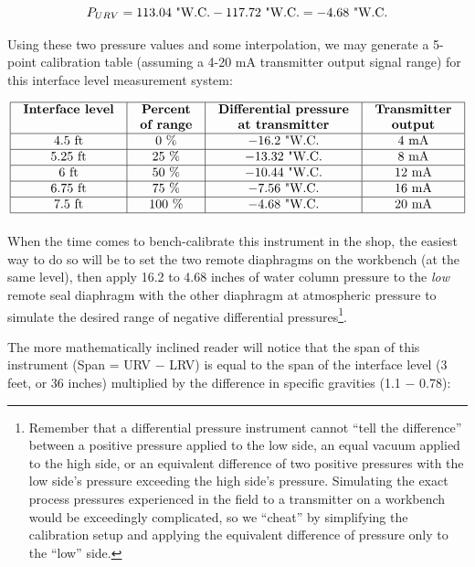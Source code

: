 $$P_{URV} = 113.04 \hbox{ "W.C.} - 117.72 \hbox{ "W.C.} = -4.68 \hbox{ "W.C.}$$

\filbreak

Using these two pressure values and some interpolation, we may generate a 5-point calibration table (assuming a 4-20 mA transmitter output signal range) for this interface level measurement system:


$$\vbox{\offinterlineskip
\halign{\strut
\vrule \quad\hfil # \ \hfil & 
\vrule \quad\hfil # \ \hfil & 
\vrule \quad\hfil # \ \hfil & 
\vrule \quad\hfil # \ \hfil \vrule \cr
\noalign{\hrule}
%
\textbf{Interface level} & \textbf{Percent} & \textbf{Differential pressure} & \textbf{Transmitter} \cr
 & \textbf{of range} & \textbf{at transmitter} & \textbf{output} \cr
%
\noalign{\hrule}
%
4.5 ft & 0 \% & $-16.2$ "W.C. & 4 mA \cr
%
\noalign{\hrule}
%
5.25 ft & 25 \% & $-13.32$ "W.C. & 8 mA \cr
%
\noalign{\hrule}
%
6 ft & 50 \% & $-10.44$ "W.C. & 12 mA \cr
%
\noalign{\hrule}
%
6.75 ft & 75 \% & $-7.56$ "W.C. & 16 mA \cr
%
\noalign{\hrule}
%
7.5 ft & 100 \% & $-4.68$ "W.C. & 20 mA \cr
%
\noalign{\hrule}
} %
}$$ %

When the time comes to bench-calibrate this instrument in the shop, the easiest way to do so will be to set the two remote diaphragms on the workbench (at the same level), then apply 16.2 to 4.68 inches of water column pressure to the \textit{low} remote seal diaphragm with the other diaphragm at atmospheric pressure to simulate the desired range of negative differential pressures\footnote{Remember that a differential pressure instrument cannot ``tell the difference'' between a positive pressure applied to the low side, an equal vacuum applied to the high side, or an equivalent difference of two positive pressures with the low side's pressure exceeding the high side's pressure.  Simulating the exact process pressures experienced in the field to a transmitter on a workbench would be exceedingly complicated, so we ``cheat'' by simplifying the calibration setup and applying the equivalent difference of pressure only to the ``low'' side.}.

\vskip 10pt

The more mathematically inclined reader will notice that the span of this instrument (Span = URV $-$ LRV) is equal to the span of the interface level (3 feet, or 36 inches) multiplied by the difference in specific gravities (1.1 $-$ 0.78):

